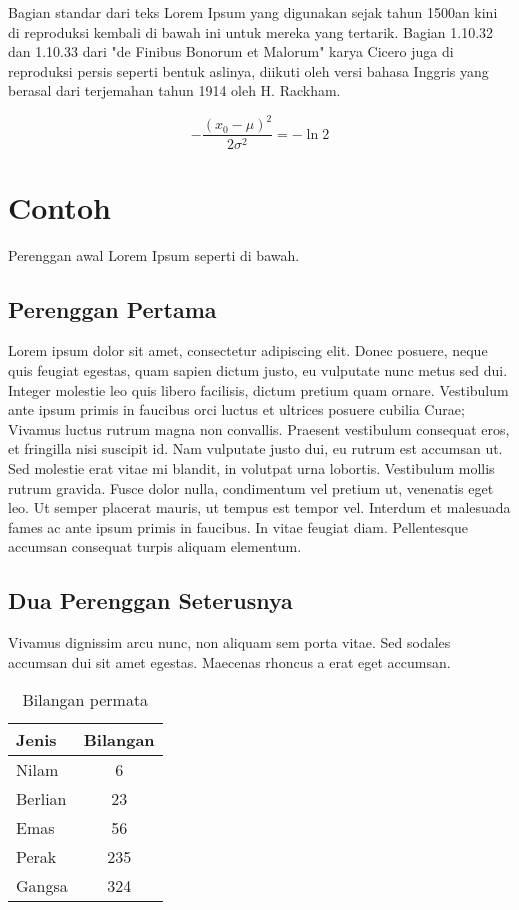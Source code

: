Bagian standar dari teks Lorem Ipsum yang digunakan sejak tahun 1500an kini di reproduksi kembali di bawah ini untuk mereka yang tertarik. Bagian 1.10.32 dan 1.10.33 dari "de Finibus Bonorum et Malorum" karya Cicero juga di reproduksi persis seperti bentuk aslinya, diikuti oleh versi bahasa Inggris yang berasal dari terjemahan tahun 1914 oleh H. Rackham.

\begin{equation}
-\frac{(x_0 - \mu)^2}{2 \sigma^2} = -\ln 2
\end{equation}


\section{Contoh}
\label{sec:contol}

Perenggan awal Lorem Ipsum seperti di bawah.

\subsection{Perenggan Pertama}

Lorem ipsum dolor sit amet, consectetur adipiscing elit. Donec posuere, neque quis feugiat egestas, quam sapien dictum justo, eu vulputate nunc metus sed dui. Integer molestie leo quis libero facilisis, dictum pretium quam ornare. Vestibulum ante ipsum primis in faucibus orci luctus et ultrices posuere cubilia Curae; Vivamus luctus rutrum magna non convallis. Praesent vestibulum consequat eros, et fringilla nisi suscipit id. Nam vulputate justo dui, eu rutrum est accumsan ut. Sed molestie erat vitae mi blandit, in volutpat urna lobortis. Vestibulum mollis rutrum gravida. Fusce dolor nulla, condimentum vel pretium ut, venenatis eget leo. Ut semper placerat mauris, ut tempus est tempor vel. Interdum et malesuada fames ac ante ipsum primis in faucibus. In vitae feugiat diam. Pellentesque accumsan consequat turpis aliquam elementum.


\subsection{Dua Perenggan Seterusnya}

Vivamus dignissim arcu nunc, non aliquam sem porta vitae. Sed sodales accumsan dui sit amet egestas. Maecenas rhoncus a erat eget accumsan.

\begin{table}[hbt!]\centering
\caption{Bilangan permata}

\begin{tabular}{l c}
\hline
Jenis & Bilangan \\\hline
Nilam & 6\\
Berlian & 23\\
Emas & 56\\
Perak & 235\\
Gangsa & 324\\\hline
\end{tabular}
\end{table}

